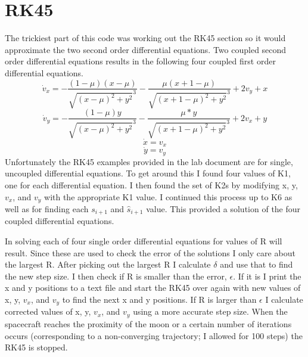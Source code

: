 \documentclass{article}
\begin{document}
\section{RK45}
The trickiest part of this code was working out the RK45 section so it would approximate the two second order differential equations. Two coupled second order differential equations results in the following four coupled first order differential equations.
\begin{equation}
    \Dot{v}_x = -\frac{(1-\mu)(x-\mu)}{\sqrt{(x-\mu)^2+y^2}^3} - \frac{\mu(x+1-\mu)}{\sqrt{(x+1-\mu)^2+y^2}^3} + 2v_y+x
\end{equation}
\begin{equation}
    \Dot{v}_y = -\frac{(1-\mu)y}{\sqrt{(x-\mu)^2+y^2}^3} - \frac{\mu*y}{\sqrt{(x+1-\mu)^2+y^2}^3} + 2v_x+y
\end{equation}
\begin{equation}
    \Dot{x} = v_x
\end{equation}
\begin{equation}
    \Dot{y} = v_y
\end{equation}
Unfortunately the RK45 examples provided in the lab document are for single, uncoupled differential equations. To get around this I found four values of K1, one for each differential equation. I then found the set of K2s by modifying x, y, $v_x$, and $v_y$ with the appropriate K1 value. I continued this process up to K6 as well as for finding each $s_{i+1}$ and $\hat{s}_{i+1}$ value. This provided a solution of the four coupled differential equations.

In solving each of four single order differential equations for values of R will result. Since these are used to check the error of the solutions I only care about the largest R. After picking out the largest R I calculate $\delta$ and use that to find the new step size. I then check if R is smaller than the error, $\epsilon$. If it is I print the x and y positions to a text file and start the RK45 over again with new values of x, y, $v_x$, and $v_y$ to find the next x and y positions. If R is larger than $\epsilon$ I calculate corrected values of x, y, $v_x$, and $v_y$ using a more accurate step size. When the spacecraft reaches the proximity of the moon or a certain number of iterations occurs (corresponding to a non-converging trajectory; I allowed for 100 steps) the RK45 is stopped.
\end{document}
